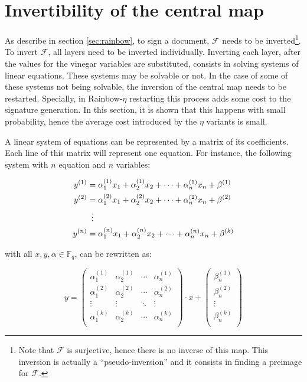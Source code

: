 \documentclass{ufsctex/ufsctex}
\begin{document}
\section{Invertibility of the central map}\label{sec:invertibility}

As describe in section \ref{sec:rainbow}, to sign a document, $\mathcal{F}$
needs to be inverted\footnote{Note that $\mathcal{F}$ is surjective, hence
there is no inverse of this map. This inversion is actually a
``pseudo-inversion'' and it consists in finding a preimage for $\mathcal{F}$.}.
To invert $\mathcal{F}$, all layers need to be inverted individually. Inverting
each layer, after the values for the vinegar variables are substituted,
consists in solving systems of linear equations. These systems may be solvable
or not. In the case of some of these systems not being solvable, the inversion
of the central map needs to be restarted. Specially, in Rainbow-$\eta$
restarting this process adds some cost to the signature generation. In this
section, it is shown that this happens with small probability, hence the
average cost introduced by the $\eta$ variants is small.

A linear system of equations can be represented by a matrix of its
coefficients. Each line of this matrix will represent one equation. For
instance, the following system with $n$ equation and $n$ variables:

\begin{equation}
\begin{split}
y^{(1)} &= \alpha^{(1)}_1 x_1 + \alpha^{(1)}_2 x_2 + \cdots +
	\alpha^{(1)}_n x_n + \beta^{(1)} \\
y^{(2)} &= \alpha^{(2)}_1 x_1 + \alpha^{(2)}_2 x_2 + \cdots +
	\alpha^{(2)}_n x_n + \beta^{(2)} \\
&\vdotswithin{=} \\
y^{(n)} &= \alpha^{(n)}_1 x_1 + \alpha^{(n)}_2 x_2 + \cdots +
	\alpha^{(n)}_n x_n + \beta^{(k)} \\
\end{split}
\end{equation}

with all $x, y, \alpha \in \mathbb{F}_q$, can be rewritten as:

\begin{equation}\label{eq:linear}
y =
\begin{pmatrix}
\alpha^{(1)}_1 & \alpha^{(1)}_2 & \cdots & \alpha^{(1)}_n \\
\alpha^{(2)}_1 & \alpha^{(2)}_2 & \cdots & \alpha^{(2)}_n \\
\vdots & \vdots & \ddots & \vdots \\
\alpha^{(k)}_1 & \alpha^{(k)}_2 & \cdots & \alpha^{(k)}_n \\
\end{pmatrix}
\cdot x +
\begin{pmatrix}
\beta^{(1)}_n \\
\beta^{(2)}_n \\
\vdots \\
\beta^{(k)}_n \\
\end{pmatrix}
\end{equation}
\end{document}
